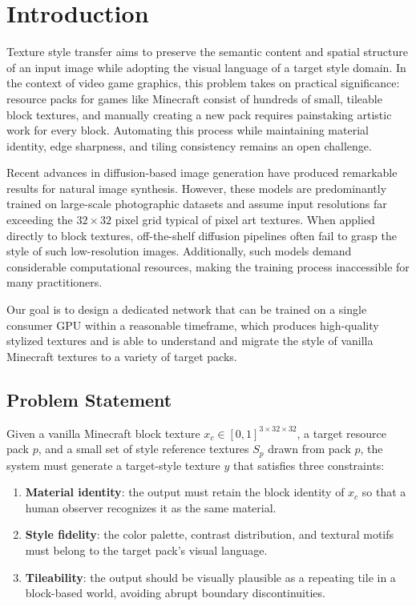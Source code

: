 \chapter{Introduction}

Texture style transfer aims to preserve the semantic content and spatial structure of an input image while adopting the visual language of a target style domain. In the context of video game graphics, this problem takes on practical significance: resource packs for games like Minecraft consist of hundreds of small, tileable block textures, and manually creating a new pack requires painstaking artistic work for every block. Automating this process while maintaining material identity, edge sharpness, and tiling consistency remains an open challenge.

Recent advances in diffusion-based image generation \citep{ho2020denoising, dhariwal2021diffusion, rombach2022high} have produced remarkable results for natural image synthesis. However, these models are predominantly trained on large-scale photographic datasets and assume input resolutions far exceeding the $32\times32$ pixel grid typical of pixel art textures. When applied directly to block textures, off-the-shelf diffusion pipelines often fail to grasp the style of such low-resolution images. Additionally, such models demand considerable computational resources, making the training process inaccessible for many practitioners.

Our goal is to design a dedicated network that can be trained on a single consumer GPU within a reasonable timeframe, which produces high-quality stylized textures and is able to understand and migrate the style of vanilla Minecraft textures to a variety of target packs.

\section{Problem Statement}

Given a vanilla Minecraft block texture \(x_c \in [0,1]^{3 \times 32 \times 32}\), a target resource pack \(p\), and a small set of style reference textures \(S_p\) drawn from pack \(p\), the system must generate a target-style texture \(y\) that satisfies three constraints:
\begin{enumerate}[label=(C\arabic*)]
    \item \textbf{Material identity}: the output must retain the block identity of \(x_c\) so that a human observer recognizes it as the same material.
    \item \textbf{Style fidelity}: the color palette, contrast distribution, and textural motifs must belong to the target pack's visual language.
    \item \textbf{Tileability}: the output should be visually plausible as a repeating tile in a block-based world, avoiding abrupt boundary discontinuities.
\end{enumerate}

